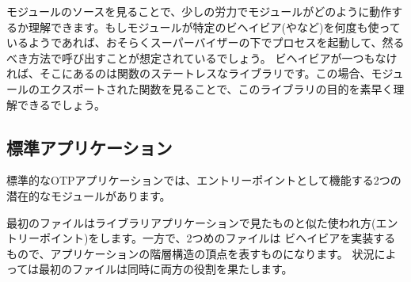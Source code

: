 
モジュールのソースを見ることで、少しの労力でモジュールがどのように動作するか理解できます。もしモジュールが特定のビヘイビア(やなど)を何度も使っているようであれば、おそらくスーパーバイザーの下でプロセスを起動して、然るべき方法で呼び出すことが想定されているでしょう。
ビヘイビアが一つもなければ、そこにあるのは関数のステートレスなライブラリです。この場合、モジュールのエクスポートされた関数を見ることで、このライブラリの目的を素早く理解できるでしょう。

\subsection{標準アプリケーション}
\label{subsec:dive-regular-applications}


標準的なOTPアプリケーションでは、エントリーポイントとして機能する2つの潜在的なモジュールがあります。

\begin{enumerate*}
	\item {}
	\item {}
\end{enumerate*}

最初のファイルはライブラリアプリケーションで見たものと似た使われ方(エントリーポイント)をします。一方で、2つめのファイルは  ビヘイビアを実装するもので、アプリケーションの階層構造の頂点を表すものになります。
状況によっては最初のファイルは同時に両方の役割を果たします。

